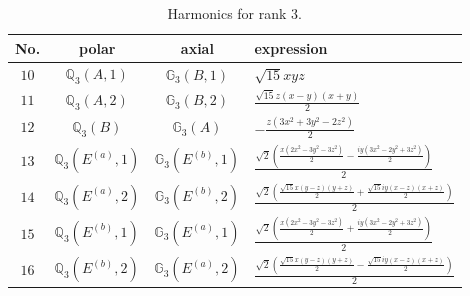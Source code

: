 \documentclass[fleqn,8pt,landscape]{jsarticle}
\begin{document}
\begin{table}[ht!]
\begin{center}
\caption{Harmonics for rank 3.}
\renewcommand{\arraystretch}{1.3}
\begin{tabular}{cccl} \hline \hline
No. & polar & axial & expression \\ \hline
$ 10 $ & $ \mathbb{Q}_{3}(A,1) $ & $ \mathbb{G}_{3}(B,1) $ & $ \sqrt{15} x y z $ \\
$ 11 $ & $ \mathbb{Q}_{3}(A,2) $ & $ \mathbb{G}_{3}(B,2) $ & $ \frac{\sqrt{15} z \left(x - y\right) \left(x + y\right)}{2} $ \\
$ 12 $ & $ \mathbb{Q}_{3}(B) $ & $ \mathbb{G}_{3}(A) $ & $ - \frac{z \left(3 x^{2} + 3 y^{2} - 2 z^{2}\right)}{2} $ \\
$ 13 $ & $ \mathbb{Q}_{3}(E^{(a)},1) $ & $ \mathbb{G}_{3}(E^{(b)},1) $ & $ \frac{\sqrt{2} \left(\frac{x \left(2 x^{2} - 3 y^{2} - 3 z^{2}\right)}{2} - \frac{i y \left(3 x^{2} - 2 y^{2} + 3 z^{2}\right)}{2}\right)}{2} $ \\
$ 14 $ & $ \mathbb{Q}_{3}(E^{(a)},2) $ & $ \mathbb{G}_{3}(E^{(b)},2) $ & $ \frac{\sqrt{2} \left(\frac{\sqrt{15} x \left(y - z\right) \left(y + z\right)}{2} + \frac{\sqrt{15} i y \left(x - z\right) \left(x + z\right)}{2}\right)}{2} $ \\
$ 15 $ & $ \mathbb{Q}_{3}(E^{(b)},1) $ & $ \mathbb{G}_{3}(E^{(a)},1) $ & $ \frac{\sqrt{2} \left(\frac{x \left(2 x^{2} - 3 y^{2} - 3 z^{2}\right)}{2} + \frac{i y \left(3 x^{2} - 2 y^{2} + 3 z^{2}\right)}{2}\right)}{2} $ \\
$ 16 $ & $ \mathbb{Q}_{3}(E^{(b)},2) $ & $ \mathbb{G}_{3}(E^{(a)},2) $ & $ \frac{\sqrt{2} \left(\frac{\sqrt{15} x \left(y - z\right) \left(y + z\right)}{2} - \frac{\sqrt{15} i y \left(x - z\right) \left(x + z\right)}{2}\right)}{2} $ \\
 \hline \hline
\end{tabular}
\end{center}
\end{table}
\end{document}
